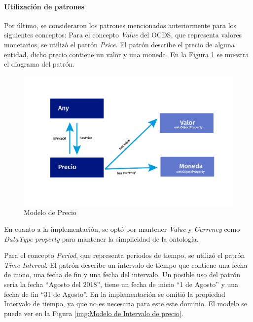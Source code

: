 \paragraph{Utilización de patrones}\hfill \break
Por último, se consideraron los patrones mencionados anteriormente para los siguientes conceptos:
\break
Para el concepto \textit{Value} del OCDS, que representa valores monetarios, se utilizó el patrón \textit{Price}. El patrón describe el precio de alguna entidad, dicho precio contiene un valor y una moneda. En la Figura \ref{img:Modelo de Precio} se muestra el diagrama del patrón.

\begin{figure}[ht!]
    \centering
    \includegraphics[width=150mm]{figuras/Diagramas_Precio.png}
    \caption{Modelo de Precio}
    \label{img:Modelo de Precio}
    
\end{figure}

En cuanto a la implementación, se optó por mantener \textit{Value} y \textit{Currency} como \textit{DataType property} para mantener la simplicidad de la ontología.

Para el concepto \textit{Period}, que representa periodos de tiempo, se utilizó el patrón \textit{Time Interval}. El patrón describe un intervalo de tiempo que contiene una fecha de inicio, una fecha de fin y una fecha del intervalo. Un posible uso del patrón sería la fecha “Agosto del 2018”, tiene un fecha de inicio “1 de Agosto” y una fecha de fin “31 de Agosto”. En la implementación se omitió la propiedad Intervalo de tiempo, ya que no es necesaria para este este dominio. El modelo se puede ver en la Figura \ref{img:Modelo de Intervalo de precio}.

